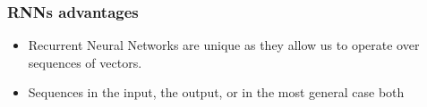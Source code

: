 \begin{frame}[fragile] \frametitle{RNNs advantages}

\begin{itemize}
\item Recurrent Neural Networks are unique as they allow us to operate over sequences of vectors.
\item Sequences in the input, the output, or in the most general case both
\end{itemize}
\end{frame}


